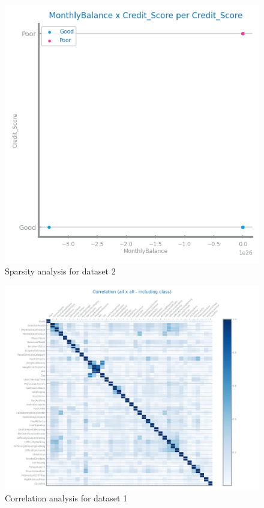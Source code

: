 \documentclass[10pt]{extarticle}
\begin{document}
\begin{figure}[H]
\includegraphics[scale=0.10]{images/dataset2/data_profiling/Credit_Score_sparsity_MonthlyBalance_per_class.png}
\caption{Sparsity analysis for dataset 2}
\end{figure}

\begin{figure}[H]
\centering\includegraphics[scale=0.6]{images/dataset1/data_profiling/CovidPos_correlation_analysis.png}
\caption{Correlation analysis for dataset 1}
\end{figure}
\end{document}
